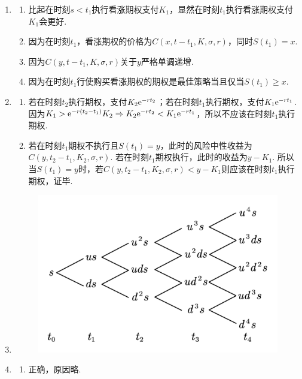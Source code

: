 \begin{enumerate}[label=\arabic{section}.\arabic*]
    \item \pro
    \begin{enumerate}[label=\alph*)]
        \item 比起在时刻$s<t_1$执行看涨期权支付$K_1$，显然在时刻$t_1$执行看涨期权支付$K_1$会更好.
        \item 因为在时刻$t_1$，看涨期权的价格为$C(x,t-t_1,K,\sigma,r)$，同时$S(t_1)=x$.
        \item 因为$C(y,t-t_1,K,\sigma,r)$关于$y$严格单调递增.
        \item 因为在时刻$t_1$行使购买看涨期权的期权是最佳策略当且仅当$S(t_1) \geq x$.
    \end{enumerate}
    \item \pro
    \begin{enumerate}[label=\alph*)]
        \item 若在时刻$t_2$执行期权，支付$K_2\mathrm{e}^{-rt_2}$；若在时刻$t_1$执行期权，支付$K_1\mathrm{e}^{-rt_1}$. 因为$K_1>\mathrm{e}^{-r(t_2-t_1)}K_2 \Rightarrow K_2\mathrm{e}^{-rt_2}<K_1\mathrm{e}^{-rt_1}$，所以不应该在时刻$t_1$执行期权.
        \item 若在时刻$t_1$期权不执行且$S(t_1)=y$，此时的风险中性收益为$C(y,t_2-t_1,K_2,\sigma,r)$. 若在时刻$t_1$期权执行，此时的收益为$y-K_1$. 所以当$S(t_1)=y$时，若$C(y,t_2-t_1,K_2,\sigma,r)<y-K_1$则应该在时刻$t_1$执行期权，证毕.
    \end{enumerate}
    \item \sol
    \begin{figure}[H]
        \centering
        \includegraphics[scale=0.35]{8.11.pdf}
    \end{figure}
    \item \sol
    \begin{enumerate}[label=\alph*)]
        \item 正确，原因略.

\end{enumerate}
\end{enumerate}
